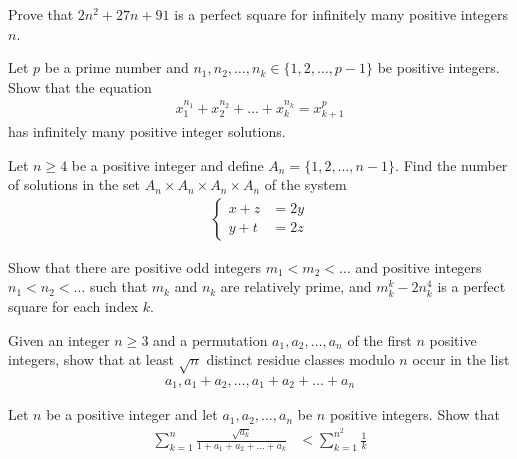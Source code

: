 \documentclass[problems.tex]{subfile}
\begin{document}
	\begin{problem}
		Prove that $2n^2 + 27n + 91$ is a perfect square for infinitely many positive integers $n$.
	\end{problem}

	\begin{problem}
		Let $p$ be a prime number and $n_1, n_2, \dots, n_k \in \{1, 2, \dots, p -1\}$ be positive integers. Show that the equation
			\begin{align*}
				x_1^{n_1} + x_2^{n_2} + \dots + x_k^{n_k} = x_{k+1}^p
			\end{align*}
		has infinitely many positive integer solutions.
	\end{problem}

	\begin{problem}
		Let $n \geq 4$ be a positive integer and define $A_n = \{1, 2, \dots, n -1\}$. Find the number of solutions in the set $A_n \times  A_n \times A_n \times A_n$ of the system
		\begin{align*}
			\begin{cases}
				x+z &= 2y\\
				y+t &= 2z
			\end{cases}
		\end{align*}
	\end{problem}

	\begin{problem}
		Show that there are positive odd integers $m_1 < m_2 < \dots  $ and positive integers $n_1 < n_2 < \dots$ such that $m_k$ and $n_k$ are relatively prime, and $m_k^k - 2n_k^4$ is a perfect square for each index $k$.
	\end{problem}


	\begin{problem}
		Given an integer $n \geq 3$ and a permutation $a_1, a_2, \dots, a_n$ of the first $n$ positive integers, show that at least $\sqrt n$ distinct residue classes modulo $n$ occur in the list
			\begin{align*}
				a_1, a_1 + a_2, \dots, a_1 + a_2 + \dots + a_n
			\end{align*}
	\end{problem}


	\begin{problem}
		Let $n$ be a positive integer and let $a_1, a_2, \dots, a_n$ be $n$ positive integers. Show that
		\begin{align*}
			\sum_{k=1}^{n} \frac{\sqrt{a_k}}{1+a_1+a_2+\dots +a_k} &< \sum_{k=1}^{n^2} \frac{1}{k}
		\end{align*}
	\end{problem}
\end{document}
